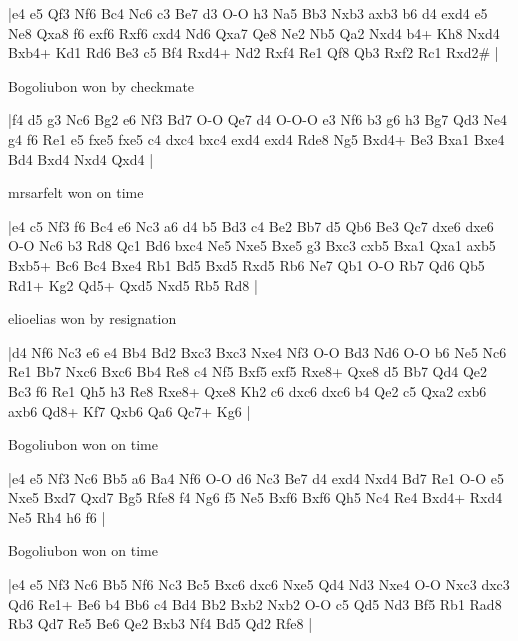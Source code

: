 \makegametitle
|e4 e5 Qf3 Nf6 Bc4 Nc6 c3 Be7 d3 O-O h3 Na5 Bb3 Nxb3 axb3 b6 d4 exd4 e5 Ne8 Qxa8 f6 exf6 Rxf6 cxd4 Nd6 Qxa7 Qe8 Ne2 Nb5 Qa2 Nxd4 b4+ Kh8 Nxd4 Bxb4+ Kd1 Rd6 Be3 c5 Bf4 Rxd4+ Nd2 Rxf4 Re1 Qf8 Qb3 Rxf2 Rc1 Rxd2\#  |

\showboard

Bogoliubon won by checkmate

\makegametitle
|f4 d5 g3 Nc6 Bg2 e6 Nf3 Bd7 O-O Qe7 d4 O-O-O e3 Nf6 b3 g6 h3 Bg7 Qd3 Ne4 g4 f6 Re1 e5 fxe5 fxe5 c4 dxc4 bxc4 exd4 exd4 Rde8 Ng5 Bxd4+ Be3 Bxa1 Bxe4 Bd4 Bxd4 Nxd4 Qxd4  |

\showboard

mrsarfelt won on time

\makegametitle
|e4 c5 Nf3 f6 Bc4 e6 Nc3 a6 d4 b5 Bd3 c4 Be2 Bb7 d5 Qb6 Be3 Qc7 dxe6 dxe6 O-O Nc6 b3 Rd8 Qc1 Bd6 bxc4 Ne5 Nxe5 Bxe5 g3 Bxc3 cxb5 Bxa1 Qxa1 axb5 Bxb5+ Bc6 Bc4 Bxe4 Rb1 Bd5 Bxd5 Rxd5 Rb6 Ne7 Qb1 O-O Rb7 Qd6 Qb5 Rd1+ Kg2 Qd5+ Qxd5 Nxd5 Rb5 Rd8  |

\showboard

elioelias won by resignation

\makegametitle
|d4 Nf6 Nc3 e6 e4 Bb4 Bd2 Bxc3 Bxc3 Nxe4 Nf3 O-O Bd3 Nd6 O-O b6 Ne5 Nc6 Re1 Bb7 Nxc6 Bxc6 Bb4 Re8 c4 Nf5 Bxf5 exf5 Rxe8+ Qxe8 d5 Bb7 Qd4 Qe2 Bc3 f6 Re1 Qh5 h3 Re8 Rxe8+ Qxe8 Kh2 c6 dxc6 dxc6 b4 Qe2 c5 Qxa2 cxb6 axb6 Qd8+ Kf7 Qxb6 Qa6 Qc7+ Kg6  |

\showboard

Bogoliubon won on time

\makegametitle
|e4 e5 Nf3 Nc6 Bb5 a6 Ba4 Nf6 O-O d6 Nc3 Be7 d4 exd4 Nxd4 Bd7 Re1 O-O e5 Nxe5 Bxd7 Qxd7 Bg5 Rfe8 f4 Ng6 f5 Ne5 Bxf6 Bxf6 Qh5 Nc4 Re4 Bxd4+ Rxd4 Ne5 Rh4 h6 f6  |

\showboard

Bogoliubon won on time

\makegametitle
|e4 e5 Nf3 Nc6 Bb5 Nf6 Nc3 Bc5 Bxc6 dxc6 Nxe5 Qd4 Nd3 Nxe4 O-O Nxc3 dxc3 Qd6 Re1+ Be6 b4 Bb6 c4 Bd4 Bb2 Bxb2 Nxb2 O-O c5 Qd5 Nd3 Bf5 Rb1 Rad8 Rb3 Qd7 Re5 Be6 Qe2 Bxb3 Nf4 Bd5 Qd2 Rfe8  |


